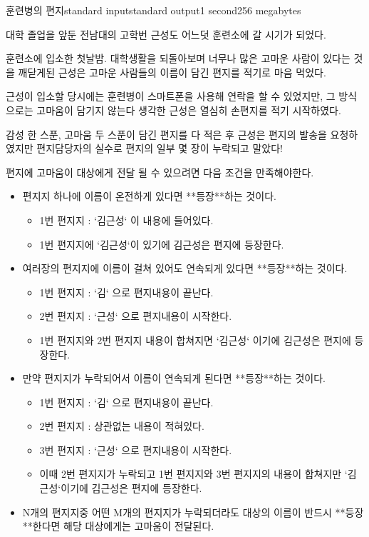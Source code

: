 \begin{problem}{훈련병의 편지}{standard input}{standard output}{1 second}{256 megabytes}

대학 졸업을 앞둔 전남대의 고학번 근성도 어느덧 훈련소에 갈 시기가 되었다.

훈련소에 입소한 첫날밤.  대학생활을 되돌아보며 너무나 많은 고마운 사람이 있다는 것을 깨닫게된 근성은 고마운 사람들의 이름이 담긴 편지를 적기로 마음 먹었다.

근성이 입소할 당시에는 훈련병이 스마트폰을 사용해 연락을 할 수 있었지만, 그 방식으로는 고마움이 담기지 않는다 생각한 근성은 열심히 손편지를 적기 시작하였다. 

감성 한 스푼, 고마움 두 스푼이 담긴 편지를 다 적은 후 근성은 편지의 발송을 요청하였지만 편지담당자의 실수로 편지의 일부 몇 장이 누락되고 말았다!

편지에 고마움이 대상에게 전달 될 수 있으려면 다음 조건을 만족해야한다.

\begin{itemize}
\item 편지지 하나에 이름이 온전하게 있다면 **등장**하는 것이다.
\begin{itemize}
    \item 1번 편지지 : `김근성` 이 내용에 들어있다.
    \item 1번 편지지에 `김근성`이 있기에 김근성은 편지에 등장한다.
\end{itemize}
\item 여러장의 편지지에 이름이 걸쳐 있어도 연속되게 있다면 **등장**하는 것이다.
\begin{itemize}
    \item 1번 편지지 : `김` 으로 편지내용이 끝난다.
    \item 2번 편지지 : `근성` 으로 편지내용이 시작한다.
    \item 1번 편지지와 2번 편지지 내용이 합쳐지면 `김근성` 이기에 김근성은 편지에 등장한다.
\end{itemize}
\item 만약 편지지가 누락되어서 이름이 연속되게 된다면 **등장**하는 것이다.
\begin{itemize}    
    \item 1번 편지지 : `김` 으로 편지내용이 끝난다.
    \item 2번 편지지 : 상관없는 내용이 적혀있다.
    \item 3번 편지지 : `근성` 으로 편지내용이 시작한다.
    \item 이때 2번 편지지가 누락되고 1번 편지지와 3번 편지지의 내용이 합쳐지만 `김근성`이기에 김근성은 편지에 등장한다.
\end{itemize}
\item N개의 편지지중 어떤 M개의 편지지가 누락되더라도 대상의 이름이 반드시 **등장**한다면 해당 대상에게는 고마움이 전달된다.
\end{itemize}


\end{problem}
